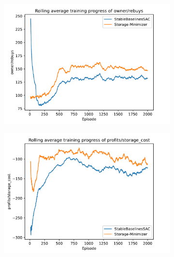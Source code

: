 \begin{figure}[!hbt]
	\centering
	\begin{subfigure}{0.49\textwidth}
		\centering
		\includegraphics[width = \textwidth]{images/experiments/SACDuopoly/SACDuopolyMixedGraphs1.pdf}\\
		\label{fig:SACDuopolyMixedGraphs1}
	\end{subfigure}
	\begin{subfigure}{0.49\textwidth}
		\centering
		\includegraphics[width = \textwidth]{images/experiments/SACDuopoly/SACDuopolyMixedGraphs2.pdf}\\
		\label{fig:SACDuopolyMixedGraphs2}
	\end{subfigure}

\end{figure}
